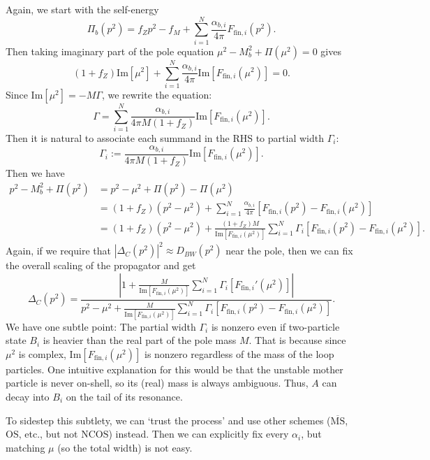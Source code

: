 \documentclass[11pt]{article}
\theoremstyle{definition}
\theoremstyle{remark}
\begin{document}
	Again, we start with the self-energy
	\[\Pi_{b}(p^{2})=f_{Z}p^{2}-f_{M}+\sum_{i=1}^{N}\frac{\alpha_{b,i}}{4\pi}F_{\text{fin},i}(p^{2}).\]
	Then taking imaginary part of the pole equation $\mu^{2}-M_{b}^{2}+\Pi(\mu^{2})=0$ gives
	\[(1+f_{Z})\mathrm{Im}[\mu^{2}]+\sum_{i=1}^{N}\frac{\alpha_{b,i}}{4\pi}\mathrm{Im}[F_{\text{fin},i}(\mu^{2})]=0.\]
	Since $\mathrm{Im}[\mu^{2}]=-M\Gamma$, we rewrite the equation:
	\[\Gamma=\sum_{i=1}^{N}\frac{\alpha_{b,i}}{4\pi M(1+f_{Z})}\mathrm{Im}[F_{\text{fin},i}(\mu^{2})].\]
	Then it is natural to associate each summand in the RHS to partial width $\Gamma_{i}$:
	\[\Gamma_{i}:=\frac{\alpha_{b,i}}{4\pi M(1+f_{Z})}\mathrm{Im}[F_{\text{fin},i}(\mu^{2})].\]
	Then we have
	\begin{align*}
		p^{2}-M_{b}^{2}+\Pi(p^{2})&=p^{2}-\mu^{2}+\Pi(p^{2})-\Pi(\mu^{2})\\
		&=(1+f_{Z})(p^{2}-\mu^{2})+\sum_{i=1}^{N}\frac{\alpha_{b,i}}{4\pi}[F_{\text{fin},i}(p^{2})-F_{\text{fin},i}(\mu^{2})]\\
		&=(1+f_{Z})(p^{2}-\mu^{2})+\frac{(1+f_{Z})M}{\mathrm{Im}[F_{\text{fin},i}(\mu^{2})]}\sum_{i=1}^{N}\Gamma_{i}[F_{\text{fin},i}(p^{2})-F_{\text{fin},i}(\mu^{2})].
	\end{align*}
	Again, if we require that $|\Delta_{C}(p^{2})|^{2}\approx D_{BW}(p^{2})$ near the pole, then we can fix the overall scaling of the propagator and get
	\[\Delta_{C}(p^{2})=\frac{\displaystyle\left|1+\frac{M}{\mathrm{Im}[F_{\text{fin},i}(\mu^{2})]}\sum_{i=1}^{N}\Gamma_{i}[F_{\text{fin},i}'(\mu^{2})]\right|}{\displaystyle p^{2}-\mu^{2}+\frac{M}{\mathrm{Im}[F_{\text{fin},i}(\mu^{2})]}\sum_{i=1}^{N}\Gamma_{i}[F_{\text{fin},i}(p^{2})-F_{\text{fin},i}(\mu^{2})]}.\]
	We have one subtle point:
	The partial width $\Gamma_{i}$ is nonzero even if two-particle state $B_{i}$ is heavier than the real part of the pole mass $M$.
	That is because since $\mu^{2}$ is complex, $\mathrm{Im}[F_{\text{fin},i}(\mu^{2})]$ is nonzero regardless of the mass of the loop particles.
	One intuitive explanation for this would be that the unstable mother particle is never on-shell, so its (real) mass is always ambiguous.
	Thus, $A$ can decay into $B_{i}$ on the tail of its resonance.
	
	To sidestep this subtlety, we can `trust the process' and use other schemes ($\overline{\mathrm{MS}}$, $\mathrm{OS}$, etc., but not $\mathrm{NCOS}$) instead.
	Then we can explicitly fix every $\alpha_{i}$, but matching $\mu$ (so the total width) is not easy.
	
\end{document}
